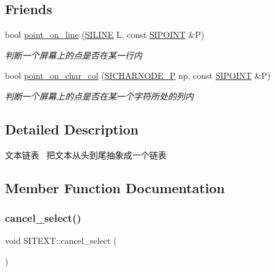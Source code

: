 \subsection*{Friends}
\begin{DoxyCompactItemize}
\item 
bool \hyperlink{class_s_i_t_e_x_t_ae39165f0f00583edee6fe18ea6bdf5e3}{point\+\_\+on\+\_\+line} (\hyperlink{struct_s_i_r_a_n_g_e}{S\+I\+L\+I\+NE} L, const \hyperlink{struct_s_i_p_o_i_n_t}{S\+I\+P\+O\+I\+NT} \&P)
\begin{DoxyCompactList}\small\item\em 判断一个屏幕上的点是否在某一行内~\newline
\end{DoxyCompactList}\item 
bool \hyperlink{class_s_i_t_e_x_t_a98cfecde826e07d0286c4e279554d1fa}{point\+\_\+on\+\_\+char\+\_\+col} (\hyperlink{class_s_i_c_h_a_r_n_o_d_e}{S\+I\+C\+H\+A\+R\+N\+O\+D\+E\+\_\+P} np, const \hyperlink{struct_s_i_p_o_i_n_t}{S\+I\+P\+O\+I\+NT} \&P)
\begin{DoxyCompactList}\small\item\em 判断一个屏幕上的点是否在某一个字符所处的列内~\newline
\end{DoxyCompactList}\end{DoxyCompactItemize}


\subsection{Detailed Description}
文本链表~\newline
把文本从头到尾抽象成一个链表 

\subsection{Member Function Documentation}
\mbox{\label{class_s_i_t_e_x_t_a3a942ca324f4c37a4d747ba7a91a293b}} 
\subsubsection{\texorpdfstring{cancel\+\_\+select()}{cancel\_select()}}
{\footnotesize\ttfamily void S\+I\+T\+E\+X\+T\+::cancel\+\_\+select (\begin{DoxyParamCaption}{ }\end{DoxyParamCaption})\hspace{0.3cm}{\ttfamily [inline]}}




